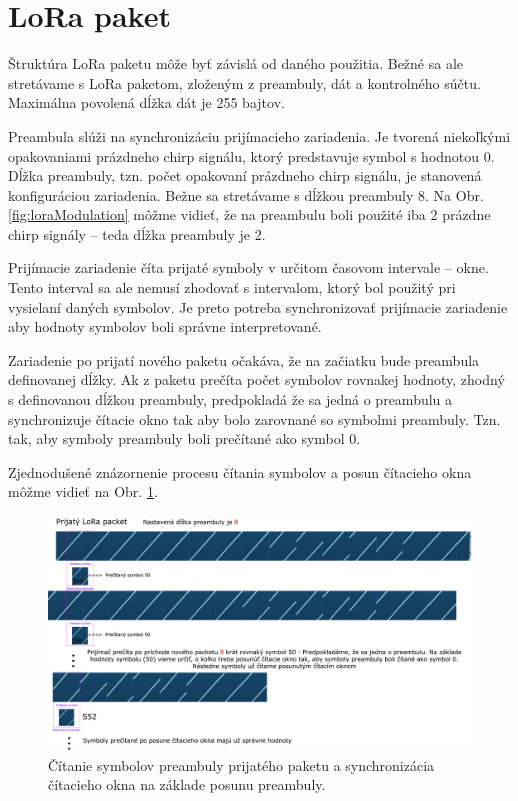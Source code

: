 \documentclass[slovak,master]{diploma}
\begin{document}
\section{LoRa paket}
Štruktúra LoRa paketu môže byť závislá od daného použitia. Bežné sa ale stretávame s LoRa paketom, zloženým z preambuly, dát a kontrolného súčtu. Maximálna 
povolená dĺžka dát je 255 bajtov.

Preambula slúži na synchronizáciu prijímacieho zariadenia. Je tvorená niekoľkými opakovaniami prázdneho chirp signálu, ktorý predstavuje symbol s hodnotou 0. 
Dĺžka preambuly, tzn. počet opakovaní prázdneho chirp signálu, je stanovená konfiguráciou zariadenia. Bežne sa stretávame s dĺžkou preambuly 8.
Na Obr. \ref{fig:loraModulation} môžme vidieť, že na preambulu boli použité iba 2 prázdne chirp signály -- teda dĺžka preambuly je 2.

Prijímacie zariadenie číta prijaté symboly v určitom časovom intervale -- okne. Tento interval sa ale nemusí zhodovať s intervalom, ktorý bol použitý pri vysielaní daných symbolov.
Je preto potreba synchronizovať prijímacie zariadenie aby hodnoty symbolov boli správne interpretované.

Zariadenie po prijatí nového paketu očakáva, že na začiatku bude preambula definovanej dĺžky. Ak z paketu prečíta počet symbolov rovnakej hodnoty, zhodný 
s definovanou dĺžkou preambuly, predpokladá že sa jedná o preambulu a synchronizuje čítacie okno tak aby bolo zarovnané so symbolmi preambuly. Tzn. tak, aby symboly preambuly boli 
prečítané ako symbol 0. 

Zjednodušené znázornenie procesu čítania symbolov a posun čítacieho okna môžme vidieť na Obr. \ref{fig:loraPreamble1}.

\begin{figure}[h!]
	\centering
	\includegraphics[width=1\textwidth]{Figures/preambulaSmall.png}
	\caption{Čítanie symbolov preambuly prijatého paketu a synchronizácia čítacieho okna na základe posunu preambuly.}
	\label{fig:loraPreamble1}
\end{figure}
\end{document}
